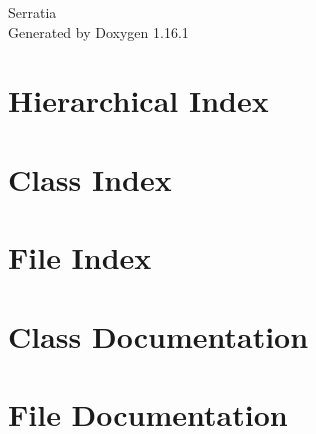 \documentclass[twoside]{book}
\newcommand{\+}{\discretionary{\mbox{\scriptsize$\hookleftarrow$}}{}{}}
\newcommand{\clearemptydoublepage}{%
    \newpage{\pagestyle{empty}\cleardoublepage}%
  }
\begin{document}
  \raggedbottom
    \hypersetup{pageanchor=false,
                bookmarksnumbered=true,
                pdfencoding=unicode
               }
  \begin{titlepage}
  \vspace*{7cm}
  \begin{center}%
  {\Large Serratia}\\
  \vspace*{1cm}
  {\large Generated by Doxygen 1.16.1}\\
  \end{center}
  \end{titlepage}
  \clearemptydoublepage
  \tableofcontents
  \clearemptydoublepage
  \hypersetup{pageanchor=true}
\chapter{Hierarchical Index}

\chapter{Class Index}

\chapter{File Index}

\chapter{Class Documentation}











\chapter{File Documentation}








  \backmatter
  \newpage
  \clearemptydoublepage
  \printindex
\end{document}
